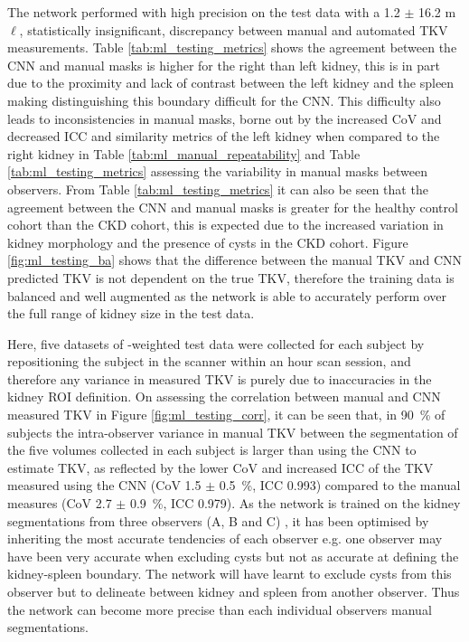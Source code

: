 The network performed with high precision on the test data with a 1.2 $\pm$ 16.2 m$\ell$, statistically insignificant, discrepancy between manual and automated \ac{TKV} measurements. Table \ref{tab:ml_testing_metrics} shows the agreement between the \ac{CNN} and manual masks is higher for the right than left kidney, this is in part due to the proximity and lack of contrast between the left kidney and the spleen making distinguishing this boundary difficult for the \ac{CNN}. This difficulty also leads to inconsistencies in manual masks, borne out by the increased \ac{CoV} and decreased \ac{ICC} and similarity metrics of the left kidney when compared to the right kidney in Table \ref{tab:ml_manual_repeatability} and Table \ref{tab:ml_testing_metrics} assessing the variability in manual masks between observers. From Table \ref{tab:ml_testing_metrics} it can also be seen that the agreement between the \ac{CNN} and manual masks is greater for the healthy control cohort than the \ac{CKD} cohort, this is expected due to the increased variation in kidney morphology and the presence of cysts in the \ac{CKD} cohort. Figure \ref{fig:ml_testing_ba} shows that the difference between the manual \ac{TKV} and \ac{CNN} predicted \ac{TKV} is not dependent on the true \ac{TKV}, therefore the training data is balanced and well augmented as the network is able to accurately perform over the full range of kidney size in the test data. 

Here, five datasets of \ttwo-weighted test data were collected for each subject by repositioning the subject in the scanner within an hour scan session, and therefore any variance in measured \ac{TKV} is purely due to inaccuracies in the kidney \ac{ROI} definition. On assessing the correlation between manual and \ac{CNN} measured \ac{TKV} in Figure \ref{fig:ml_testing_corr}, it can be seen that, in 90~\% of subjects the intra-observer variance in manual \ac{TKV} between the segmentation of the five volumes collected in each subject is larger than using the \ac{CNN} to estimate \ac{TKV}, as reflected by the lower \ac{CoV} and increased \ac{ICC} of the \ac{TKV} measured using the \ac{CNN} (\ac{CoV} 1.5 $\pm$ 0.5~\%, \ac{ICC} 0.993) compared to the manual measures (\ac{CoV} 2.7 $\pm$ 0.9~\%, ICC 0.979). As the network is trained on the kidney segmentations from three observers (A, B and C) , it has been optimised by inheriting the most accurate tendencies of each observer e.g. one observer may have been very accurate when excluding cysts but not as accurate at defining the kidney-spleen boundary. The network will have learnt to exclude cysts from this observer but to delineate between kidney and spleen from another observer. Thus the network can become more precise than each individual observers manual segmentations. 

